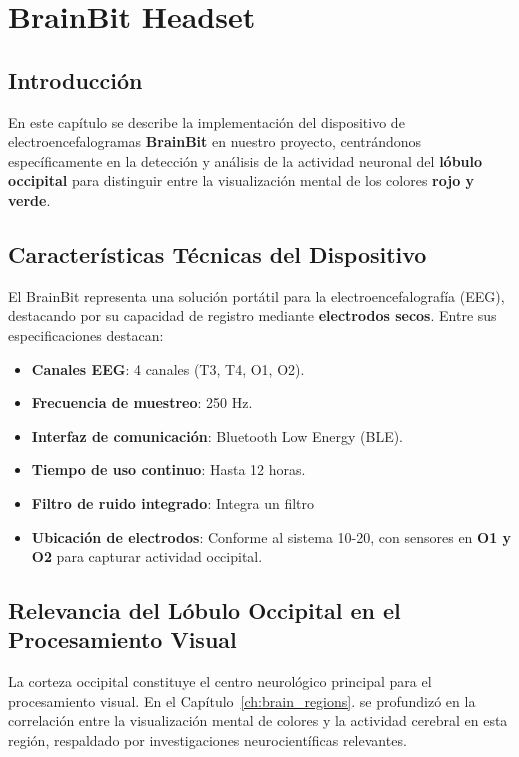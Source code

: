 \chapter{BrainBit Headset}

\section{Introducci\'on}
En este capítulo se describe la implementación del dispositivo de electroencefalogramas \textbf{BrainBit} \cite{brainbit} en nuestro proyecto, centrándonos específicamente en la detección y análisis de la actividad neuronal del \textbf{lóbulo occipital} para distinguir entre la visualización mental de los colores \textbf{rojo y verde}.

\section{Características Técnicas del Dispositivo}
El BrainBit representa una solución portátil para la electroencefalografía (EEG), destacando por su capacidad de registro mediante \textbf{electrodos secos}. Entre sus especificaciones destacan:

    \begin{itemize}
        \item \textbf{Canales EEG}: 4 canales (T3, T4, O1, O2).
        \item \textbf{Frecuencia de muestreo}: 250 Hz.
        \item \textbf{Interfaz de comunicación}: Bluetooth Low Energy (BLE).
        \item \textbf{Tiempo de uso continuo}: Hasta 12 horas.
        \item \textbf{Filtro de ruido integrado}: Integra un filtro
        \item \textbf{Ubicación de electrodos}: Conforme al sistema 10-20, con sensores en \textbf{O1 y O2} para capturar actividad occipital.
    \end{itemize}

\section{Relevancia del Lóbulo Occipital en el Procesamiento Visual}
La corteza occipital constituye el centro neurológico principal para el procesamiento visual. En el Capítulo~\ref{ch:brain_regions}. se profundizó en la correlación entre la visualización mental de colores y la actividad cerebral en esta región, respaldado por investigaciones neurocientíficas relevantes.

